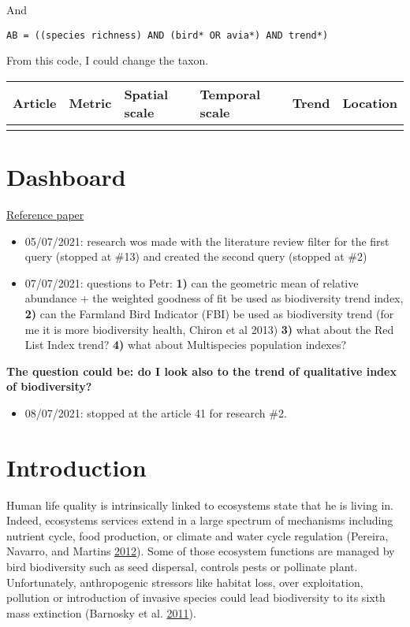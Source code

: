 \documentclass[
  12pt,
  oneside]{report}
\providecommand{\tightlist}{%
  \setlength{\itemsep}{0pt}\setlength{\parskip}{0pt}}
\begin{document}
And

\begin{verbatim}
AB = ((species richness) AND (bird* OR avia*) AND trend*) 
\end{verbatim}

From this code, I could change the taxon.

\begin{longtable}[]{@{}llllll@{}}
\toprule
Article & Metric & Spatial scale & Temporal scale & Trend & Location\tabularnewline
\midrule
\endhead
& & & & &\tabularnewline
\bottomrule
\end{longtable}

\hypertarget{dashboard}{%
\chapter*{Dashboard}\label{dashboard}}

\href{https://www.sciencedirect.com/science/article/pii/S1470160X20306658?via\%3Dihub}{Reference paper}

\begin{itemize}
\item
  05/07/2021: research wos made with the literature review filter for the first query (stopped at \#13) and created the second query (stopped at \#2)
\item
  07/07/2021: questions to Petr: \textbf{1)} can the geometric mean of relative abundance + the weighted goodness of fit be used as biodiversity trend index, \textbf{2)} can the Farmland Bird Indicator (FBI) be used as biodiversity trend (for me it is more biodiversity health, Chiron et al 2013) \textbf{3)} what about the Red List Index trend? \textbf{4)} what about Multispecies population indexes?
\end{itemize}

\textbf{The question could be: do I look also to the trend of qualitative index of biodiversity?}

\begin{itemize}
\tightlist
\item
  08/07/2021: stopped at the article 41 for research \#2.
\end{itemize}

\hypertarget{introduction}{%
\chapter{Introduction}\label{introduction}}

Human life quality is intrinsically linked to ecosystems state that he is living in. Indeed, ecosystems services extend in a large spectrum of mechanisms including nutrient cycle, food production, or climate and water cycle regulation (Pereira, Navarro, and Martins \protect\hyperlink{ref-pereira_global_2012}{2012}). Some of those ecosystem functions are managed by bird biodiversity such as seed dispersal, controls pests or pollinate plant. Unfortunately, anthropogenic stressors like habitat loss, over exploitation, pollution or introduction of invasive species could lead biodiversity to its sixth mass extinction (Barnosky et al. \protect\hyperlink{ref-barnosky_has_2011}{2011}).
\end{document}
